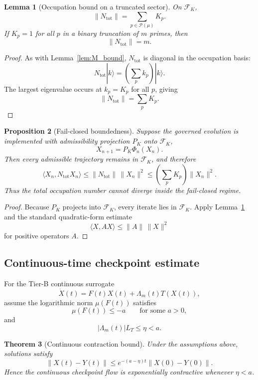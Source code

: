 \documentclass[11pt,a4paper]{article}
\theoremstyle{plain}
\newtheorem{theorem}{Theorem}[section]
\newtheorem{lemma}[theorem]{Lemma}
\newtheorem{proposition}[theorem]{Proposition}
\theoremstyle{definition}
\theoremstyle{remark}
\begin{document}
\begin{lemma}[Occupation bound on a truncated sector]
\label{lem:Ntot_bound}
On \(\mathcal F_K\),
\[
\|N_{\mathrm{tot}}\| = \sum_{p\in\mathcal P(\mu)} K_p.
\]
If \(K_p=1\) for all \(p\) in a binary truncation of \(m\) primes, then
\[
\|N_{\mathrm{tot}}\| = m.
\]
\end{lemma}

\begin{proof}
As with Lemma~\ref{lem:M_bound}, \(N_{\mathrm{tot}}\) is diagonal in the occupation basis:
\[
N_{\mathrm{tot}}|k\rangle = \left(\sum_p k_p\right)|k\rangle.
\]
The largest eigenvalue occurs at \(k_p=K_p\) for all \(p\), giving
\[
\|N_{\mathrm{tot}}\|=\sum_p K_p.
\]
\end{proof}

\begin{proposition}[Fail-closed boundedness]
Suppose the governed evolution is implemented with admissibility projection \(P_K\) onto \(\mathcal F_K\),
\[
X_{n+1}=P_K\Phi_n(X_n).
\]
Then every admissible trajectory remains in \(\mathcal F_K\), and therefore
\[
\langle X_n, N_{\mathrm{tot}} X_n\rangle
\le
\|N_{\mathrm{tot}}\|\,\|X_n\|^2
\le
\left(\sum_p K_p\right)\|X_n\|^2.
\]
Thus the total occupation number cannot diverge inside the fail-closed regime.
\end{proposition}

\begin{proof}
Because \(P_K\) projects into \(\mathcal F_K\), every iterate lies in \(\mathcal F_K\). Apply Lemma~\ref{lem:Ntot_bound} and the standard quadratic-form estimate
\[
\langle X,AX\rangle \le \|A\|\,\|X\|^2
\]
for positive operators \(A\).
\end{proof}

\subsection{Continuous-time checkpoint estimate}

For the Tier-B continuous surrogate
\[
\dot X(t)=F(t)X(t)+\Lambda_m(t)T(X(t)),
\]
assume the logarithmic norm \(\mu(F(t))\) satisfies
\[
\mu(F(t))\le -a
\qquad\text{for some } a>0,
\]
and
\[
|\Lambda_m(t)|L_T\le \eta<a.
\]

\begin{theorem}[Continuous contraction bound]
\label{thm:continuous_bound}
Under the assumptions above, solutions satisfy
\[
\|X(t)-Y(t)\|
\le
e^{-(a-\eta)t}\|X(0)-Y(0)\|.
\]
Hence the continuous checkpoint flow is exponentially contractive whenever \(\eta<a\).
\end{theorem}
\end{document}
